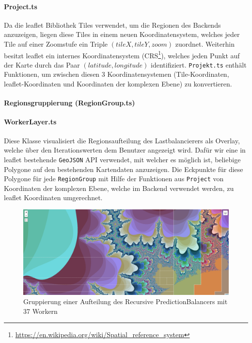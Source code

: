 \begin{figure}[h!]
	
\end{figure}

\paragraph{Project.ts}
Da die leaflet Bibliothek Tiles verwendet, um die Regionen des Backends anzuzeigen, liegen diese Tiles in 
einem neuen Koordinatensystem, welches jeder Tile auf einer Zoomstufe ein Triple \( (tileX, tileY, zoom) \)
zuordnet. Weiterhin besitzt leaflet ein internes Koordinatensystem (CRS\footnote{\url{https://en.wikipedia.org/wiki/Spatial_reference_system}}),
welches jeden Punkt auf der Karte durch das Paar \( (latitude, longitude) \) identifiziert. 
\verb|Projekt.ts| enthält Funktionen, um zwischen diesen 3 Koordinatensystemen (Tile-Koordinaten, leaflet-Koordinaten 
und Koordinaten der komplexen Ebene) zu konvertieren.

\paragraph{Regionsgruppierung (RegionGroup.ts)}\label{par:regionGroup}

\paragraph{WorkerLayer.ts}\label{par:workerLayer}
Diese Klasse visualisiert die Regionsaufteilung des Lastbalancierers als Overlay, welche über den Iterationswerten
dem Benutzer angezeigt wird. Dafür wir eine in leaflet bestehende \verb|GeoJSON| API verwendet, mit welcher es möglich
ist, beliebige Polygone auf den bestehenden Kartendaten anzuzeigen. Die Eckpunkte für diese Polygone für jede \verb|RegionGroup| 
mit Hilfe der Funktionen aus \verb|Project| von Koordinaten der komplexen Ebene, welche im Backend verwendet werden, zu 
leaflet Koordinaten umgerechnet.

\begin{figure}[h!]
	\centering
	\includegraphics[width=\linewidth]{img/Implementierung/regionGrouping}
	\caption{Gruppierung einer Aufteilung des Recursive PredictionBalancers mit 37 Workern}
	\label{fig:regionGrouping}
\end{figure}

